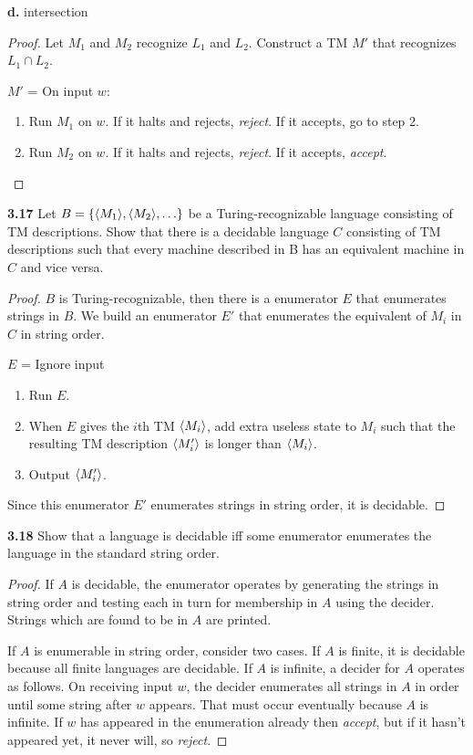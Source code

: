 \textbf{d.} intersection
\begin{mdframed}
\begin{proof}
Let $M_1$ and $M_2$ recognize $L_1$ and $L_2$. Construct a TM $M'$ that recognizes $L_1 \cap L_2$.

$M'$ = On input $w$:
\begin{enumerate}
\item Run $M_1$ on $w$. If it halts and rejects, \textit{reject}. If it accepts, go to step 2.
\item Run $M_2$ on $w$. If it halts and rejects, \textit{reject}. If it accepts, \textit{accept}.
\end{enumerate}
\end{proof}
\end{mdframed}

\textbf{3.17}  Let $B = \{\langle{M_1}\rangle, \langle{M_2}\rangle, \ldots \}$ be a Turing-recognizable language consisting of TM descriptions. Show that there is a decidable language $C$ consisting of TM descriptions such that every machine described in B has an equivalent machine in $C$ and vice versa.
\begin{mdframed}
\begin{proof}
$B$ is Turing-recognizable, then there is a enumerator $E$ that enumerates strings in $B$. We build an enumerator $E'$ that enumerates the equivalent of $M_i$ in $C$ in string order. 

\medskip
$E$ = Ignore input
\begin{enumerate}
\item Run $E$.
\item When $E$ gives the $i$th TM $\langle{M_i}\rangle$, add extra useless state to $M_i$ such that the resulting TM description $\langle{M_i'}\rangle$ is longer than $\langle{M_i}\rangle$.
\item Output $\langle{M_i'}\rangle$.
\end{enumerate}

Since this enumerator $E'$ enumerates strings in string order, it is decidable.
\end{proof}
\end{mdframed}

\textbf{3.18} Show that a language is decidable iff some enumerator enumerates the language in the standard string order.
\begin{mdframed}
\begin{proof}
If $A$ is decidable, the enumerator operates by generating the strings in string order and testing each in turn for membership in $A$ using the decider. Strings which are found to be in $A$ are printed.

\medskip
If $A$ is enumerable in string order, consider two cases. If $A$ is finite, it is decidable because all finite languages are decidable. If $A$ is infinite, a decider for $A$ operates as follows. On receiving input $w$, the decider enumerates all strings in $A$ in order until some string after $w$ appears. That must occur eventually because $A$ is infinite. If $w$ has appeared in the enumeration already then \textit{accept}, but if it hasn't appeared yet, it never will, so \textit{reject}. 
\end{proof}
\end{mdframed}

